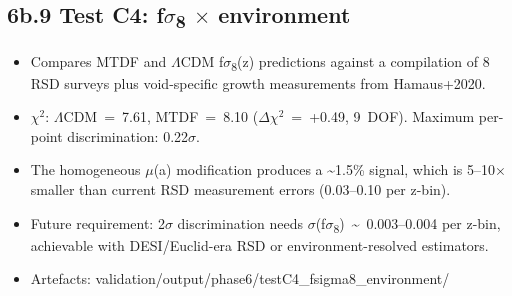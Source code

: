 \documentclass[11pt,a4paper]{article}
\begin{document}
\subsection{6b.9 Test C4: f$\sigma$\textsubscript{8} $\times$ environment}
\begin{itemize}
  \item Compares MTDF and $\Lambda$CDM f$\sigma$\textsubscript{8}(z) predictions against a compilation of 8 RSD surveys plus void-specific growth measurements from Hamaus+2020.
  \item $\chi$$^{2}$: $\Lambda$CDM~=~7.61, MTDF~=~8.10 ($\Delta$$\chi$$^{2}$~=~+0.49, 9~DOF). Maximum per-point discrimination: 0.22$\sigma$.
  \item The homogeneous $\mu$(a) modification produces a \~{}1.5\% signal, which is 5--10$\times$ smaller than current RSD measurement errors (0.03--0.10 per z-bin).
  \item Future requirement: 2$\sigma$ discrimination needs $\sigma$(f$\sigma$\textsubscript{8})~\~{}~0.003--0.004 per z-bin, achievable with DESI/\allowbreak{}Euclid-era RSD or environment-resolved estimators.
  \item Artefacts: validation/\allowbreak{}output/\allowbreak{}phase6/\allowbreak{}testC4\_\allowbreak{}fsigma8\_\allowbreak{}environment/\allowbreak{}
\end{itemize}
\end{document}

